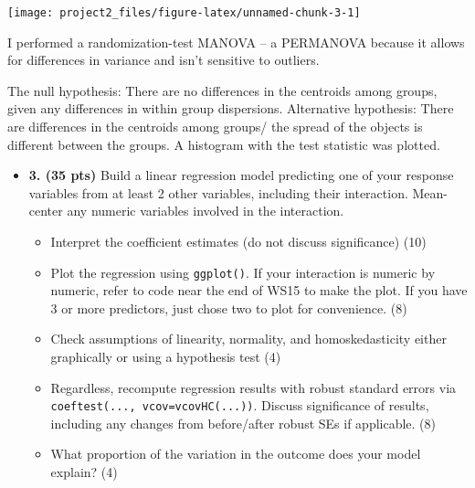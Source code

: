 \documentclass[]{article}
\newenvironment{Shaded}{\begin{snugshade}}{\end{snugshade}}
\newcommand{\DataTypeTok}[1]{\textcolor[rgb]{0.13,0.29,0.53}{#1}}
\newcommand{\KeywordTok}[1]{\textcolor[rgb]{0.13,0.29,0.53}{\textbf{#1}}}
\newcommand{\NormalTok}[1]{#1}
\newcommand{\OperatorTok}[1]{\textcolor[rgb]{0.81,0.36,0.00}{\textbf{#1}}}
\newcommand{\StringTok}[1]{\textcolor[rgb]{0.31,0.60,0.02}{#1}}
\providecommand{\tightlist}{%
  \setlength{\itemsep}{0pt}\setlength{\parskip}{0pt}}
\begin{document}
\begin{center}\texttt{[image: project2\_files/figure-latex/unnamed-chunk-3-1]} \end{center}

I performed a randomization-test MANOVA -- a PERMANOVA because it allows
for differences in variance and isn't sensitive to outliers.

The null hypothesis: There are no differences in the centroids among
groups, given any differences in within group dispersions. Alternative
hypothesis: There are differences in the centroids among groups/ the
spread of the objects is different between the groups. A histogram with
the test statistic was plotted.

\begin{itemize}
\item
  \textbf{3. (35 pts)} Build a linear regression model predicting one of
  your response variables from at least 2 other variables, including
  their interaction. Mean-center any numeric variables involved in the
  interaction.

  \begin{itemize}
  \tightlist
  \item
    Interpret the coefficient estimates (do not discuss significance)
    (10)
  \item
    Plot the regression using \texttt{ggplot()}. If your interaction is
    numeric by numeric, refer to code near the end of WS15 to make the
    plot. If you have 3 or more predictors, just chose two to plot for
    convenience. (8)
  \item
    Check assumptions of linearity, normality, and homoskedasticity
    either graphically or using a hypothesis test (4)
  \item
    Regardless, recompute regression results with robust standard errors
    via \texttt{coeftest(...,\ vcov=vcovHC(...))}. Discuss significance
    of results, including any changes from before/after robust SEs if
    applicable. (8)
  \item
    What proportion of the variation in the outcome does your model
    explain? (4)
  \end{itemize}
\end{itemize}

\begin{Shaded}
\end{Shaded}
\end{document}
